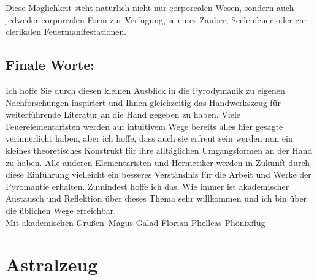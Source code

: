 \documentclass[a5paper,8pt]{book}
\begin{document}
Diese Möglichkeit steht natürlich nicht nur corporealen Wesen, sondern auch jedweder corporealen Form zur Verfügung, seien 
es Zauber, Seelenfeuer oder gar clerikalen Feuermanifestationen.

\subsection{Finale Worte:}
Ich hoffe Sie durch diesen kleinen Ausblick in die Pyrodymanik zu eigenen Nachforschungen inspiriert und Ihnen gleichzeitig 
das Handwerkszeug für weiterführende Literatur an die Hand gegeben zu haben.
Viele Feuerelementaristen werden auf intuitivem Wege bereits alles hier gesagte verinnerlicht haben, aber ich hoffe, dass
auch sie erfreut sein werden nun ein kleines theoretisches Konstrukt für ihre alltäglichen Umgangsformen an der Hand zu 
haben.
Alle anderen Elementaristen und Hermetiker werden in Zukunft durch diese Einführung vielleicht ein besseres Verständnis 
für die Arbeit und Werke der Pyromantie erhalten.
Zumindest hoffe ich das.
Wie immer ist akademischer Austausch und Reflektion über dieses Thema sehr willkommen und ich bin über die üblichen Wege 
erreichbar.\\

Mit akademischen Grüßen\
Magus Galad Florian Phelleas Phönixflug

\newpage

\section{Astralzeug}
\end{document}
